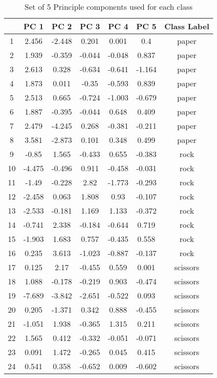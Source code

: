 \begin{table}
\centering
\begin{tabular}{|c|c|c|c|c|c|c|}
\hline & PC 1 & PC 2 &PC 3& PC 4& PC 5 & Class Label\\\hline
1 & 2.456 & -2.448 & 0.201 & 0.001 & 0.4 & paper\\\hline
2 & 1.939 & -0.359 & -0.044 & -0.048 & 0.837 & paper\\\hline
3 & 2.613 & 0.328 & -0.634 & -0.641 & -1.164 & paper\\\hline
4 & 1.873 & 0.011 & -0.35 & -0.593 & 0.839 & paper\\\hline 
5 & 2.513 & 0.665 & -0.724 & -1.003 & -0.679 & paper\\\hline
6 & 1.887 & -0.395 & -0.044 & 0.648 & 0.409 & paper\\\hline
7 & 2.479 & -4.245 & 0.268 & -0.381 & -0.211 & paper\\\hline
8 & 3.581 & -2.873 & 0.101 & 0.348 & 0.499 & paper\\\hline
9 & -0.85 & 1.565 & -0.433 & 0.655 & -0.383 & rock\\\hline
10 & -4.475 & -0.496 & 0.911 & -0.458 & -0.031 & rock\\\hline
11 & -1.49 & -0.228 & 2.82 & -1.773 & -0.293 & rock\\\hline 
12 & -2.458 & 0.063 & 1.808 & 0.93 & -0.107 & rock\\\hline
13 & -2.533 & -0.181 & 1.169 & 1.133 & -0.372 & rock\\\hline
14 & -0.741 & 2.338 & -0.184 & -0.644 & 0.719 & rock\\\hline 
15 & -1.903 & 1.683 & 0.757 & -0.435 & 0.558 & rock\\\hline
16 &  0.235 & 3.613 & -1.023 & -0.887 & -0.137 & rock\\\hline 
17 & 0.125 & 2.17 & -0.455 & 0.559 & 0.001 & scissors\\\hline 
18 &  1.088 & -0.178 & -0.219 & 0.903 & -0.474 & scissors\\\hline
19 &  -7.689 & -3.842 & -2.651 & -0.522 & 0.093 & scissors\\\hline 
20 &  0.205 & -1.371 & 0.342 & 0.888 & -0.455 & scissors\\\hline 
21 & -1.051 & 1.938 & -0.365 & 1.315 & 0.211 & scissors\\\hline 
22 & 1.565 & 0.412 & -0.332 & -0.051 & -0.071 & scissors\\\hline
23 &  0.091 & 1.472 & -0.265 & 0.045 & 0.415 & scissors\\\hline 
24 & 0.541 & 0.358 & -0.652 & 0.009 & -0.602 & scissors\\\hline
\end{tabular}
\caption{Set of 5 Principle components used for each class} 
\label{tbl:features}
\end{table}